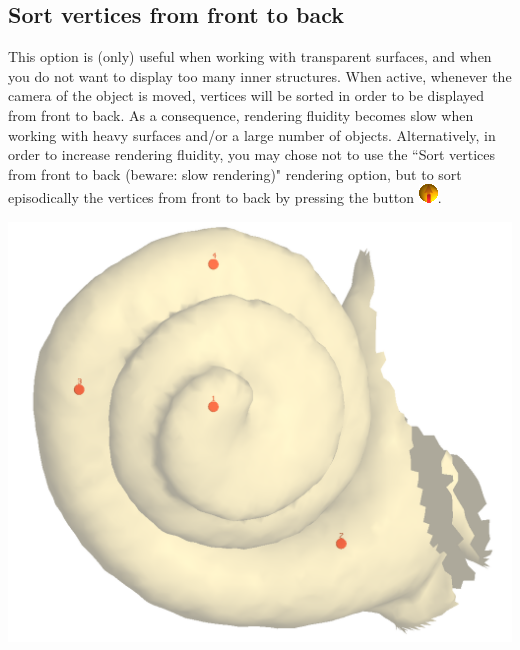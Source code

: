 \noindent
\begin{minipage}{0.55\textwidth}

\subsection{Sort vertices from front to back}\label{sort_front_back}
This option is (only) useful when working with transparent surfaces, and when you do not want to display too many inner structures. When active, whenever the camera of the object is moved, vertices will be sorted in order to be displayed from front to back. As a consequence, rendering fluidity becomes slow when working with heavy surfaces and/or a large number of objects. Alternatively, in order to increase rendering fluidity, you may chose not to use the ``Sort vertices from front to back (beware: slow rendering)" rendering option, but to sort
episodically the vertices from front to back by pressing the button \includegraphics[scale=0.7]{images/pixmap/Sort_vertices02.png}.

\end{minipage}  
 \begin{minipage}{0.45\textwidth}\centering

\includegraphics[scale=0.1]{images/Viewing_options/Sort_front_back.png}

 \end{minipage} 
\noindent

